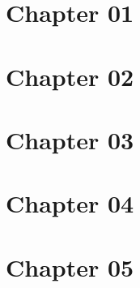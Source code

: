 \chapter{Chapter 01}


\chapter{Chapter 02}


\chapter{Chapter 03}


\chapter{Chapter 04}


\chapter{Chapter 05}
